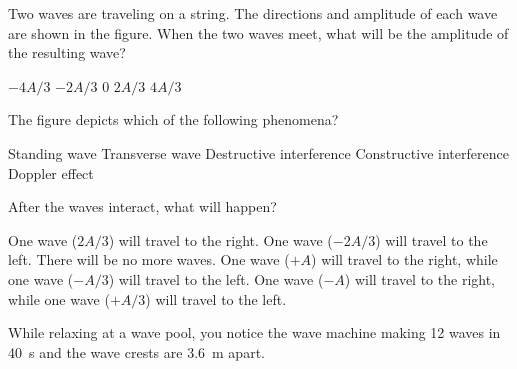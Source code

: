 \documentclass{../../oss-apphys-exam}
\begin{document}
\begin{questions}
  \question Two waves are traveling on a string. The directions and amplitude
  of each wave are shown in the figure. When the two waves meet, what will be
  the amplitude of the resulting wave?
  \label{des1}
  \begin{choices}
    \choice $-4A/3$
    \choice $-2A/3$
    \choice $0$
    \choice $2A/3$
    \choice $4A/3$
  \end{choices}
    
  \question The figure depicts which of the following phenomena?
  \begin{choices}
    \choice Standing wave
    \choice Transverse wave
    \choice Destructive interference
    \choice Constructive interference
    \choice Doppler effect
  \end{choices}
    
  \question After the waves interact, what will happen?
  \label{des2}
  \begin{choices}
    \choice One wave ($2A/3$) will travel to the right.
    \choice One wave ($-2A/3$) will travel to the left.
    \choice There will be no more waves.
    \choice One wave ($+A$) will travel to the right, while one wave ($-A/3$)
    will travel to the left.
    \choice One wave ($-A$) will travel to the right, while one wave ($+A/3$)
    will travel to the left.
  \end{choices}
  \newpage
      

  \question While relaxing at a wave pool, you notice the wave machine making 12
  waves in \SI{40}{\second} and the wave crests are \SI{3.6}{\metre} apart.
\end{questions}
\end{document}
